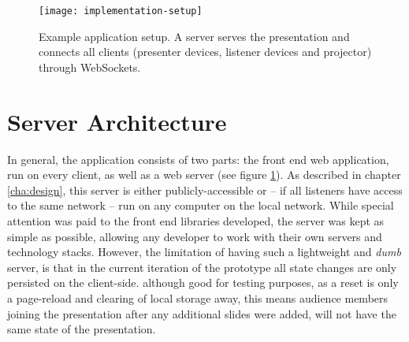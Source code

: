 \begin{figure}
\centering
\texttt{[image: implementation-setup]}
\caption{Example application setup. A server serves the presentation and connects all clients (presenter devices, listener devices and projector) through WebSockets.}
\label{fig:implementation-architecture-setup}
\end{figure}

\section{Server Architecture}
\label{sec:implementation-server}

In general, the application consists of two parts: the front end web application, run on every client, as well as a web server (see figure \ref{fig:implementation-architecture-setup}). As described in chapter \ref{cha:design}, this server is either publicly-accessible or -- if all listeners have access to the same network -- run on any computer on the local network. While special attention was paid to the front end libraries developed, the server was kept as simple as possible, allowing any developer to work with their own servers and technology stacks. However, the limitation of having such a lightweight and \emph{dumb} server, is that in the current iteration of the prototype all state changes are only persisted on the client-side. although good for testing purposes, as a reset is only a page-reload and clearing of local storage away, this means audience members joining the presentation after any additional slides were added, will not have the same state of the presentation.

